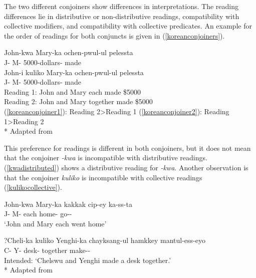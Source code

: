 The two different conjoiners show differences in interpretations. The reading differences lie in distributive or non-distributive readings, compatibility with collective modifiers, and compatibility with collective predicates. An example for the order of readings for both conjuncts is given in (\ref{koreanconjoiners}).

\begin{exe}
    \ex \label{koreanconjoiners}
    \begin{xlist}
        \ex \label{koreanconjoiner1} 
        \gll John-kwa Mary-ka ochen-pwul-ul pelessta \\ 
        J-{\And} M-{\Nom} 5000-dollars-{\Acc} made \\
        
        \ex \label{koreanconjoiner2}
        \gll John-i kuliko Mary-ka ochen-pwul-ul pelessta \\ 
        J-{\Nom} {\And} M-{\Nom} 5000-dollars-{\Acc} made \\
        \glt Reading 1: John and Mary each made \$5000 \\
        Reading 2: John and Mary together made \$5000 \\
        (\ref{koreanconjoiner1}): Reading 2\textgreater Reading 1 (\ref{koreanconjoiner2}): Reading 1\textgreater Reading 2\\*
        \hfill Adapted from \cite{yoon2005conjunction}
    \end{xlist}
\end{exe}

This preference for readings is different in both conjoiners, but it does not mean that the conjoiner \textit{-kwa} is incompatible with distributive readings. (\ref{kwadistributed}) shows a distributive reading for \textit{-kwa}. Another observation is that the conjoiner \textit{kuliko} is incompatible with collective readings (\ref{kulikocollective}).

\begin{exe}
    \ex \begin{xlist}
    \ex \label{kwadistributed}
    \gll John-kwa Mary-ka kakkak cip-ey ka-ss-ta \\ 
    J-{\And} M-{\Nom} each home-{\Loc} go-{\Pst}-{\Decl} \\
    \glt `John and Mary each went home'
    
    \ex \label{kulikocollective}
    \gll *?Cheli-ka kuliko Yenghi-ka chayksang-ul hamkkey mantul-ess-eyo \\
    C-{\Nom} {\And} Y-{\Nom} desk-{\Acc} together make-{\Pst}-{\Decl} \\
    \glt Intended: `Chelswu and Yenghi made a desk together.'\\*
    \hfill Adapted from \cite{yoon2005conjunction}
    \end{xlist}
 \end{exe}

